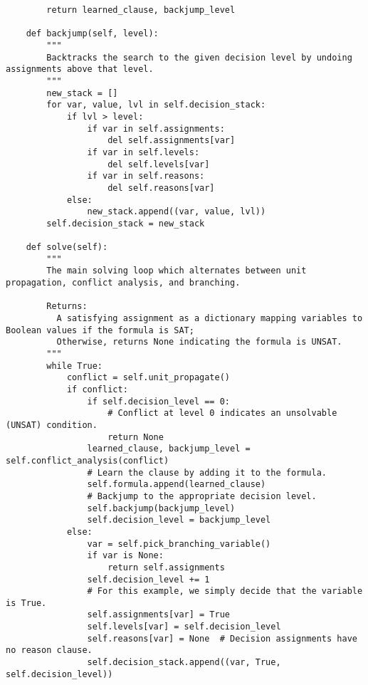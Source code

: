 \begin{lstlisting}
        return learned_clause, backjump_level

    def backjump(self, level):
        """
        Backtracks the search to the given decision level by undoing assignments above that level.
        """
        new_stack = []
        for var, value, lvl in self.decision_stack:
            if lvl > level:
                if var in self.assignments:
                    del self.assignments[var]
                if var in self.levels:
                    del self.levels[var]
                if var in self.reasons:
                    del self.reasons[var]
            else:
                new_stack.append((var, value, lvl))
        self.decision_stack = new_stack

    def solve(self):
        """
        The main solving loop which alternates between unit propagation, conflict analysis, and branching.
        
        Returns:
          A satisfying assignment as a dictionary mapping variables to Boolean values if the formula is SAT;
          Otherwise, returns None indicating the formula is UNSAT.
        """
        while True:
            conflict = self.unit_propagate()
            if conflict:
                if self.decision_level == 0:
                    # Conflict at level 0 indicates an unsolvable (UNSAT) condition.
                    return None
                learned_clause, backjump_level = self.conflict_analysis(conflict)
                # Learn the clause by adding it to the formula.
                self.formula.append(learned_clause)
                # Backjump to the appropriate decision level.
                self.backjump(backjump_level)
                self.decision_level = backjump_level
            else:
                var = self.pick_branching_variable()
                if var is None:
                    return self.assignments
                self.decision_level += 1
                # For this example, we simply decide that the variable is True.
                self.assignments[var] = True
                self.levels[var] = self.decision_level
                self.reasons[var] = None  # Decision assignments have no reason clause.
                self.decision_stack.append((var, True, self.decision_level))
\end{lstlisting}


